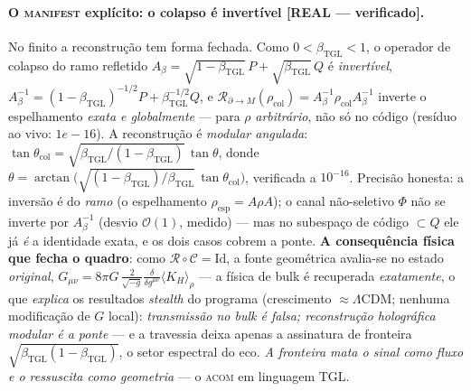 \documentclass[12pt,a4paper]{article}
\newcommand{\betatgl}{\beta_{\text{TGL}}}
\newcommand{\TGL}{\textsc{TGL}}
\begin{document}
\paragraph{O \textsc{manifest} explícito: o colapso é invertível \textbf{[REAL --- verificado]}.} No finito a reconstrução tem forma fechada. Como $0<\betatgl<1$, o operador de colapso do ramo refletido $A_\beta=\sqrt{1-\betatgl}\,P+\sqrt{\betatgl}\,Q$ é \emph{invertível}, $A_\beta^{-1}=(1-\betatgl)^{-1/2}P+\betatgl^{-1/2}Q$, e $\mathcal R_{\partial\to M}(\rho_{\mathrm{col}})=A_\beta^{-1}\rho_{\mathrm{col}}A_\beta^{-1}$ inverte o espelhamento \emph{exata e globalmente} --- para $\rho$ \emph{arbitrário}, não só no código (resíduo ao vivo: $1e-16$). A reconstrução é \emph{modular angulada}: $\tan\theta_{\mathrm{col}}=\sqrt{\betatgl/(1-\betatgl)}\,\tan\theta$, donde $\theta=\arctan\big(\sqrt{(1-\betatgl)/\betatgl}\,\tan\theta_{\mathrm{col}}\big)$, verificada a $10^{-16}$. Precisão honesta: a inversão é do \emph{ramo} (o espelhamento $\rho_{\mathrm{esp}}=A\rho A$); o canal não-seletivo $\Phi$ não se inverte por $A_\beta^{-1}$ (desvio $\mathcal O(1)$, medido) --- mas no subespaço de código $\subset Q$ ele já \emph{é} a identidade exata, e os dois casos cobrem a ponte. \textbf{A consequência física que fecha o quadro}: como $\mathcal R\circ\mathcal C=\mathrm{Id}$, a fonte geométrica avalia-se no estado \emph{original}, $G_{\mu\nu}=8\pi G\,\tfrac{2}{\sqrt{-g}}\tfrac{\delta}{\delta g^{\mu\nu}}\langle K_H\rangle_{\rho}$ --- a física de bulk é recuperada \emph{exatamente}, o que \emph{explica} os resultados \emph{stealth} do programa (crescimento $\approx\Lambda$CDM; nenhuma modificação de $G$ local): \emph{transmissão no bulk é falsa; reconstrução holográfica modular é a ponte} --- e a travessia deixa apenas a assinatura de fronteira $\sqrt{\betatgl(1-\betatgl)}$, o setor espectral do eco. \emph{A fronteira mata o sinal como fluxo e o ressuscita como geometria} --- o \textsc{acom} em linguagem \TGL.
\end{document}
